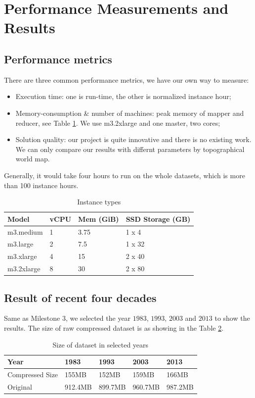 \section{Performance Measurements and Results}

\subsection{Performance metrics}
There are three common performance metrics, we have our own way to measure:
\begin{itemize}
    \item Execution time: one is run-time, the other is normalized instance hour;
    \item Memory-consumption \& number of machines: peak memory of mapper and reducer, see Table \ref{table:m3}. We use m3.2xlarge and one master, two cores;
    \item Solution quality: our project is quite innovative and there is no existing work. We can only compare our results with differnt parameters by topographical world map\cite{world}.
\end{itemize}
Generally, it would take four hours to run on the whole datasets, which is more than 100 instance hours.

\begin{table}[htbp]
    \centering
    \label{table:m3}
    \begin{tabular}{|l|l|l|l|}
        \hline
        Model & vCPU & Mem (GiB) & SSD Storage (GB) \\
        \hline
        m3.medium & 1 & 3.75 & 1 x 4  \\
        m3.large  & 2 & 7.5 & 1 x 32 \\
        m3.xlarge & 4 & 15 & 2 x 40 \\
        m3.2xlarge& 8 & 30 & 2 x 80 \\
        \hline
    \end{tabular}
    \caption{Instance types}
\end{table}

\subsection{Result of recent four decades}
Same as Milestone $3$, we selected the year $1983$, $1993$, $2003$ and $2013$ to show the results. The size of raw compressed dataset is as showing in the Table \ref{table:4year}.

\begin{table}[htbp]
    \centering
    \label{table:4year}
    \begin{tabular}{|l|l|l|l|l|}
        \hline
        Year & 1983 & 1993 & 2003 & 2013 \\
        \hline
        Compressed Size & 155MB & 152MB & 159MB & 166MB \\
        \hline
        Original & 912.4MB & 899.7MB & 960.7MB & 987.2MB \\
        \hline
    \end{tabular}
    \caption{Size of dataset in selected years}
\end{table}

